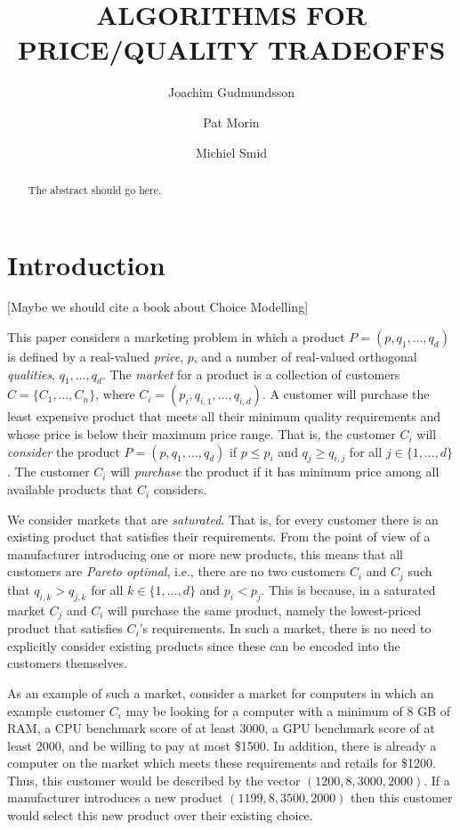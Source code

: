 \documentclass[lotsofwhite]{patmorin}
\title{\MakeUppercase{Algorithms for Price/Quality Tradeoffs}}
\author{Joachim Gudmundsson%
	\and Pat Morin%
	\and Michiel Smid}
\begin{document}
\maketitle
\begin{abstract}
The abstract should go here.
\end{abstract}

\newpage

\tableofcontents

\newpage 

\section{Introduction}

[Maybe we should cite a book about Choice Modelling]

This paper considers a marketing problem in which a product
$P=(p,q_1,\ldots,q_d)$ is defined by a real-valued \emph{price}, $p$,
and a number of real-valued orthogonal \emph{qualities},
$q_1,\ldots,q_d$.  The \emph{market} for a product is a collection of
customers $C=\{C_1,\ldots,C_n\}$, where
$C_i=(p_i,q_{i,1},\ldots,q_{i,d})$.  A customer will purchase the
least expensive product that meets all their minimum quality
requirements and whose price is below their maximum price range.  That
is, the customer $C_i$ will \emph{consider} the product
$P=(p,q_1,\ldots,q_d)$ if $p \le p_i$ and $q_j \ge q_{i,j}$ for all
$j\in\{1,\ldots,d\}$.  The customer $C_i$ will \emph{purchase} the
product if it has minimum price among all available products that
$C_i$ considers.

We consider markets that are \emph{saturated}.  That is, for every
customer there is an existing product that satisfies their
requirements. From the point of view of a manufacturer introducing one
or more new products, this means that all customers are \emph{Pareto
optimal}, i.e., there are no two customers $C_i$ and $C_j$ such that
$q_{i,k} > q_{j,k}$ for all $k\in\{1,\ldots,d\}$ and $p_i < p_j$.
This is because, in a saturated market $C_j$ and $C_i$ will purchase
the same product, namely the lowest-priced product that satisfies
$C_i$'s requirements.  In such a market, there is no need to
explicitly consider existing products since these can be encoded into
the customers themselves.

As an example of such a market, consider a market for computers in
which an example customer $C_i$ may be looking for a computer with a
minimum of 8 GB of RAM, a CPU benchmark score of at least 3000, a GPU
benchmark score of at least 2000, and be willing to pay at most
\$1500.  In addition, there is already a computer on the market which
meets these requirements and retails for \$1200.  Thus, this customer
would be described by the vector $(1200,8,3000,2000)$.  If a
manufacturer introduces a new product $(1199,8,3500,2000)$ then this
customer would select this new product over their existing choice.
\end{document}
